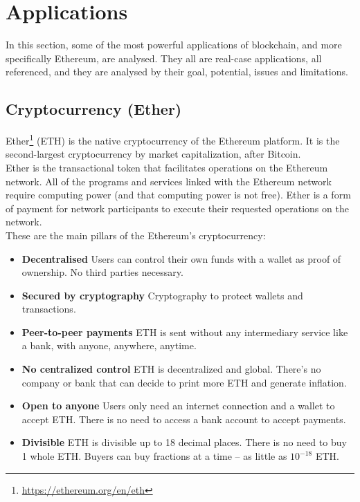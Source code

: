 \documentclass[10pt]{article}
\begin{document}
\begin{multicols}{2}
\begin{itemize}
\end{itemize}

\section{Applications}

In this section, some of the most powerful applications of blockchain, and more specifically Ethereum, are analysed. They all are real-case applications, all referenced, and they are analysed by their goal, potential, issues and limitations.

\subsection{Cryptocurrency (Ether)}

Ether\footnote{\url{https://ethereum.org/en/eth}} (ETH) is the native cryptocurrency of the Ethereum platform. It is the second-largest cryptocurrency by market capitalization, after Bitcoin.\\

Ether is the transactional token that facilitates operations on the Ethereum network. All of the programs and services linked with the Ethereum network require computing power (and that computing power is not free). Ether is a form of payment for network participants to execute their requested operations on the network.\\

These are the main pillars of the Ethereum's cryptocurrency:

\begin{itemize}
	\item \textbf{Decentralised} Users can control their own funds with a wallet as proof of ownership. No third parties necessary.
	\item \textbf{Secured by cryptography} Cryptography to protect wallets and  transactions.
	\item \textbf{Peer-to-peer payments} ETH is sent without any intermediary service like a bank, with anyone, anywhere, anytime.
	\item \textbf{No centralized control} ETH is decentralized and global. There's no company or bank that can decide to print more ETH and generate inflation.
	\item \textbf{Open to anyone} Users only need an internet connection and a wallet to accept ETH. There is no need to access a bank account to accept payments.
	\item \textbf{Divisible} ETH is divisible up to 18 decimal places. There is no need to buy 1 whole ETH. Buyers can buy fractions at a time – as little as \(10^{-18}\) ETH.
\end{itemize}


\end{multicols}
\end{document}
